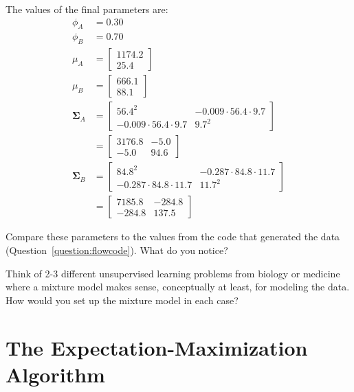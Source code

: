 \noindent The values of the final parameters are:
\begin{align*} 
\phi_A &= 0.30 \\
\phi_B &= 0.70 \\
\mu_A &= \begin{bmatrix} 1174.2 \\ 25.4 \end{bmatrix} \\
\mu_B &= \begin{bmatrix} 666.1 \\ 88.1 \end{bmatrix} \\
\boldsymbol\Sigma_A &= \begin{bmatrix} 56.4^2 & -0.009 \cdot 56.4 \cdot 9.7 \\ -0.009 \cdot 56.4 \cdot 9.7 & 9.7^2  \end{bmatrix} \\
&= \begin{bmatrix} 3176.8 & -5.0 \\ -5.0 & 94.6 \end{bmatrix} \\
\boldsymbol\Sigma_B &= \begin{bmatrix} 84.8^2 & -0.287 \cdot 84.8 \cdot 11.7 \\ -0.287 \cdot 84.8 \cdot 11.7 & 11.7^2  \end{bmatrix} \\
&= \begin{bmatrix} 7185.8 & -284.8 \\ -284.8 & 137.5 \end{bmatrix}
\end{align*}

\begin{question}{}
Compare these parameters to the values from the code that generated the data (Question~\ref{question:flowcode}). What do you notice? 
\end{question}

\begin{question}{}
Think of 2-3 different unsupervised learning problems from biology or medicine where a mixture model makes sense, conceptually at least, for modeling the data. How would you set up the mixture model in each case?
\end{question}


\section{The Expectation-Maximization Algorithm}

